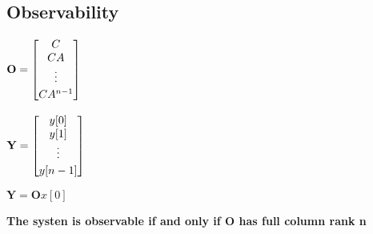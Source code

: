 \subsection{Observability}
    \begin{minipage}{0.33\linewidth}
        \centering
        $\mathbf{O} = \begin{bmatrix} \strut C \\ \strut CA \\ \raisebox{0.5ex}{\vdots} \\  \strut CA^{n-1} \end{bmatrix}$
    \end{minipage}
    \begin{minipage}{0.32\linewidth}
        \centering
        $\mathbf{Y} = \begin{bmatrix} \strut y[0] \\ \strut y[1] \\ \raisebox{0.5ex}{\vdots} \\ \strut y[n-1] \end{bmatrix}$
    \end{minipage}
    \begin{minipage}{0.32\linewidth}
        \centering
        $\mathbf{Y} = \mathbf{O}x[0]$
    \end{minipage}
    \vspace{3pt}

    \textbf{The systen is observable if and only if $\mathbf{O}$ has full column rank n}